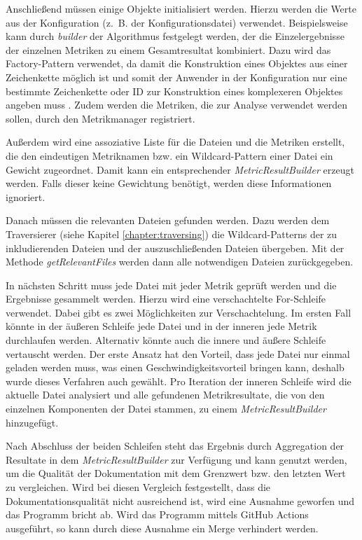 Anschließend müssen einige Objekte  initialisiert werden. Hierzu werden die Werte aus der Konfiguration (z.~B. der Konfigurationsdatei) verwendet. Beispielsweise kann durch \textit{builder} der Algorithmus festgelegt werden, der die Einzelergebnisse der einzelnen Metriken zu einem Gesamtresultat kombiniert. Dazu wird das Factory-Pattern verwendet, da damit die Konstruktion eines Objektes aus einer Zeichenkette möglich ist und somit der Anwender in der Konfiguration nur eine bestimmte Zeichenkette oder ID zur Konstruktion eines komplexeren Objektes angeben muss \cite[S.~149-161]{gamma2015design}. Zudem werden die Metriken, die zur Analyse verwendet werden sollen, durch den Metrikmanager registriert.

Außerdem wird eine assoziative Liste für die Dateien und die Metriken erstellt, die den eindeutigen Metriknamen bzw. ein Wildcard-Pattern einer Datei ein Gewicht zugeordnet. Damit kann ein entsprechender \textit{MetricResultBuilder} erzeugt werden. Falls dieser keine Gewichtung benötigt, werden diese Informationen ignoriert. 

Danach müssen die relevanten Dateien gefunden werden. Dazu werden dem Traversierer (siehe Kapitel \ref{chapter:traversing}) die Wildcard-Patterns der zu inkludierenden Dateien und der auszuschließenden Dateien übergeben. Mit der Methode \textit{getRelevantFiles} werden dann alle notwendigen Dateien zurückgegeben.

In nächsten Schritt muss jede Datei mit jeder Metrik geprüft werden und die Ergebnisse gesammelt werden. Hierzu wird eine verschachtelte For-Schleife verwendet. Dabei gibt es zwei Möglichkeiten zur Verschachtelung. Im ersten Fall könnte in der äußeren Schleife jede Datei und in der inneren jede Metrik durchlaufen werden. Alternativ könnte auch die innere und äußere Schleife vertauscht werden. Der erste Ansatz hat den Vorteil, dass jede Datei nur einmal geladen werden muss, was einen Geschwindigkeitsvorteil bringen kann, deshalb wurde dieses Verfahren auch gewählt. Pro Iteration der inneren Schleife wird die aktuelle Datei analysiert und alle gefundenen Metrikresultate, die von den einzelnen Komponenten der Datei stammen, zu einem \textit{MetricResultBuilder} hinzugefügt.

Nach Abschluss der beiden Schleifen steht das Ergebnis durch Aggregation der Resultate in dem \textit{MetricResultBuilder} zur Verfügung und kann genutzt werden, um die Qualität der Dokumentation mit dem Grenzwert bzw. den letzten Wert zu vergleichen. Wird bei diesen Vergleich festgestellt, dass die Dokumentationsqualität nicht ausreichend ist, wird eine Ausnahme geworfen und das Programm bricht ab. Wird das Programm mittels GitHub Actions ausgeführt, so kann durch diese Ausnahme ein Merge verhindert werden.

